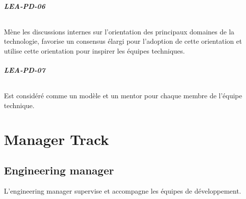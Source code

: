 \documentclass[a4paper, french, openany, 12pt]{book}
\newcommand\cha[1]{\textcolor{OliveGreen}{\textbf{\uppercase{lea-{#1}}}}}
\begin{document}
\begin{multicols}{2}
  \paragraph*{\cha{pd-06}}

  Mène les discussions internes sur l'orientation des principaux domaines de la technologie, favorise un consensus élargi
  pour l'adoption de cette orientation et utilise cette orientation pour inspirer les équipes techniques.

  \paragraph*{\cha{pd-07}}

  Est considéré comme un modèle et un mentor pour chaque membre de l'équipe technique.

\end{multicols}

\part{Manager Track}

\chapter{Engineering manager}

L'engineering manager supervise et accompagne les équipes de développement.
\end{document}
